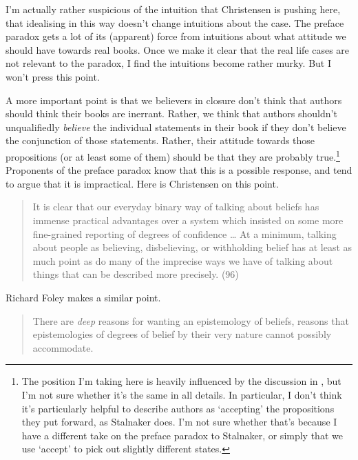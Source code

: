 I'm actually rather suspicious of the intuition that Christensen is pushing here, that idealising in this way doesn't change intuitions about the case. The preface paradox gets a lot of its (apparent) force from intuitions about what attitude we should have towards real books. Once we make it clear that the real life cases are not relevant to the paradox, I find the intuitions become rather murky. But I won't press this point. 

A more important point is that we believers in closure don't think that authors should think their books are inerrant. Rather, we think that authors shouldn't unqualifiedly \textit{believe} the individual statements in their book if they don't believe the conjunction of those statements. Rather, their attitude towards those propositions (or at least some of them) should be that they are probably true.\footnote{The position I'm taking here is heavily influenced by the discussion in \citep{Stalnaker1984}, but I'm not sure whether it's the same in all details. In particular, I don't think it's particularly helpful to describe authors as `accepting' the propositions they put forward, as Stalnaker does. I'm not sure whether that's because I have a different take on the preface paradox to Stalnaker, or simply that we use `accept' to pick out slightly different states.} Proponents of the preface paradox know that this is a possible response, and tend to argue that it is impractical. Here is Christensen on this point.

\begin{quote}
It is clear that our everyday binary way of talking about beliefs has immense practical advantages over a system which insisted on some more fine-grained reporting of degrees of confidence {\dots} At a minimum, talking about people as believing, disbelieving, or withholding belief has at least as much point as do many of the imprecise ways we have of talking about things that can be described more precisely. (96)
\end{quote}

\noindent Richard Foley makes a similar point.

\begin{quote}
There are \textit{deep} reasons for wanting an epistemology of beliefs, reasons that epistemologies of degrees of belief by their very nature cannot possibly accommodate. \citep[170, my emphasis]{Foley1993}
\end{quote}

